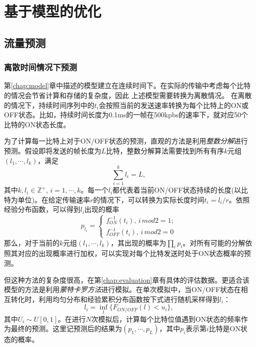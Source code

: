 
\chapter{基于模型的优化}
\label{chap:optimization}
\section{流量预测}
\subsection{离散时间情况下预测}
第\ref{chap:model}章中描述的模型建立在连续时间下。在实际的传输中考虑每个比特的情况会节省计算和存储的复杂度，因此
上述模型需要转换为离散情况。
在离散的情况下，持续时间序列中的$t_i$会按照当前的发送速率转换为每个比特上的ON或OFF状态。比如，持续时间长度为0.1ms的一帧在500kpbs的速率下，就对应50个比特的ON状态长度。

为了计算每一比特上对于ON/OFF状态的预测，直观的方法是利用\emph{整数分解}进行预测。假设即将发送的帧长度为$L$比特，整数分解算法需要找到所有有序$k$元组$(l_1, \cdots, l_k)$，满足
\begin{equation}
	\sum_{i = 1}^{k} l_i = L,
\end{equation}
其中$k,l_i \in \mathbb{Z}^+,\,i = 1,\cdots,k$。每一个$l_i$都代表着当前ON/OFF状态持续的长度(以比特为单位)。在给定传输速率$r$的情况下，可以转换为实际长度时间$t_i = l_i/r$。依照经验分布函数，可以得到$l_i$出现的概率
\begin{equation}
p_{l_i} = 
\begin{cases}
f_{ON}^{-1}(t_i), \,i\, mod 2 = 1;\\
f_{OFF}^{-1}(t_i), \,i\, mod 2 = 0
\end{cases}
\end{equation}
那么，对于当前的$k$元组$(l_1, \cdots, l_k)$，其出现的概率为$\prod_{i}p_i$。对所有可能的分解依照其对应的出现概率进行加权，可以实现对每个比特发送时处于ON状态概率的预测。

但这种方法的复杂度很高，在第\ref{chap:evaluation}章有具体的评估数据。更适合该模型的方法是利用\emph{蒙特卡罗方法}进行模拟。在单次模拟中，当ON/OFF状态在相互转化时，利用均匀分布和经验累积分布函数按下式进行随机采样得到$l_i$：
\begin{equation}
l_i = \inf_l\{F_{ON/OFF}(l) < u_i\},
\end{equation}
其中$U_i \sim U[0,1]$。在进行$N$次模拟后，计算每个比特位值遇到ON状态的频率作为最终的预测。这里记预测后的结果为$(p_1, \cdots, p_L)$，其中$p_i$表示第$i$比特是ON状态的概率。


